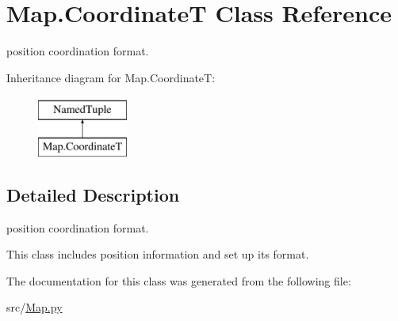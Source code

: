 \hypertarget{class_map_1_1_coordinate_t}{}\section{Map.\+CoordinateT Class Reference}
\label{class_map_1_1_coordinate_t}


position coordination format.  


Inheritance diagram for Map.\+CoordinateT\+:\begin{figure}[H]
\begin{center}
\leavevmode
\includegraphics[height=2.000000cm]{class_map_1_1_coordinate_t}
\end{center}
\end{figure}


\subsection{Detailed Description}
position coordination format. 

This class includes position information and set up its format. 

The documentation for this class was generated from the following file\+:\begin{DoxyCompactItemize}
\item 
src/\mbox{\hyperlink{_map_8py}{Map.\+py}}\end{DoxyCompactItemize}
